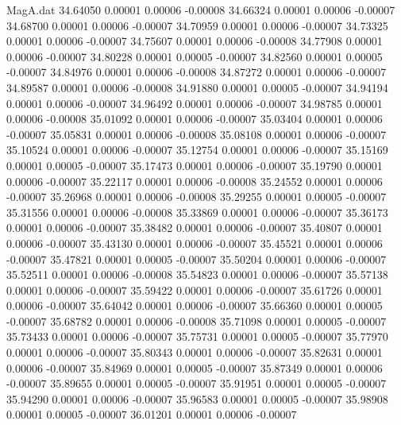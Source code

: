 \begin{filecontents}{MagA.dat}
  34.64050    0.00001    0.00006   -0.00008
  34.66324    0.00001    0.00006   -0.00007
  34.68700    0.00001    0.00006   -0.00007
  34.70959    0.00001    0.00006   -0.00007
  34.73325    0.00001    0.00006   -0.00007
  34.75607    0.00001    0.00006   -0.00008
  34.77908    0.00001    0.00006   -0.00007
  34.80228    0.00001    0.00005   -0.00007
  34.82560    0.00001    0.00005   -0.00007
  34.84976    0.00001    0.00006   -0.00008
  34.87272    0.00001    0.00006   -0.00007
  34.89587    0.00001    0.00006   -0.00008
  34.91880    0.00001    0.00005   -0.00007
  34.94194    0.00001    0.00006   -0.00007
  34.96492    0.00001    0.00006   -0.00007
  34.98785    0.00001    0.00006   -0.00008
  35.01092    0.00001    0.00006   -0.00007
  35.03404    0.00001    0.00006   -0.00007
  35.05831    0.00001    0.00006   -0.00008
  35.08108    0.00001    0.00006   -0.00007
  35.10524    0.00001    0.00006   -0.00007
  35.12754    0.00001    0.00006   -0.00007
  35.15169    0.00001    0.00005   -0.00007
  35.17473    0.00001    0.00006   -0.00007
  35.19790    0.00001    0.00006   -0.00007
  35.22117    0.00001    0.00006   -0.00008
  35.24552    0.00001    0.00006   -0.00007
  35.26968    0.00001    0.00006   -0.00008
  35.29255    0.00001    0.00005   -0.00007
  35.31556    0.00001    0.00006   -0.00008
  35.33869    0.00001    0.00006   -0.00007
  35.36173    0.00001    0.00006   -0.00007
  35.38482    0.00001    0.00006   -0.00007
  35.40807    0.00001    0.00006   -0.00007
  35.43130    0.00001    0.00006   -0.00007
  35.45521    0.00001    0.00006   -0.00007
  35.47821    0.00001    0.00005   -0.00007
  35.50204    0.00001    0.00006   -0.00007
  35.52511    0.00001    0.00006   -0.00008
  35.54823    0.00001    0.00006   -0.00007
  35.57138    0.00001    0.00006   -0.00007
  35.59422    0.00001    0.00006   -0.00007
  35.61726    0.00001    0.00006   -0.00007
  35.64042    0.00001    0.00006   -0.00007
  35.66360    0.00001    0.00005   -0.00007
  35.68782    0.00001    0.00006   -0.00008
  35.71098    0.00001    0.00005   -0.00007
  35.73433    0.00001    0.00006   -0.00007
  35.75731    0.00001    0.00005   -0.00007
  35.77970    0.00001    0.00006   -0.00007
  35.80343    0.00001    0.00006   -0.00007
  35.82631    0.00001    0.00006   -0.00007
  35.84969    0.00001    0.00005   -0.00007
  35.87349    0.00001    0.00006   -0.00007
  35.89655    0.00001    0.00005   -0.00007
  35.91951    0.00001    0.00005   -0.00007
  35.94290    0.00001    0.00006   -0.00007
  35.96583    0.00001    0.00005   -0.00007
  35.98908    0.00001    0.00005   -0.00007
  36.01201    0.00001    0.00006   -0.00007

\end{filecontents}
